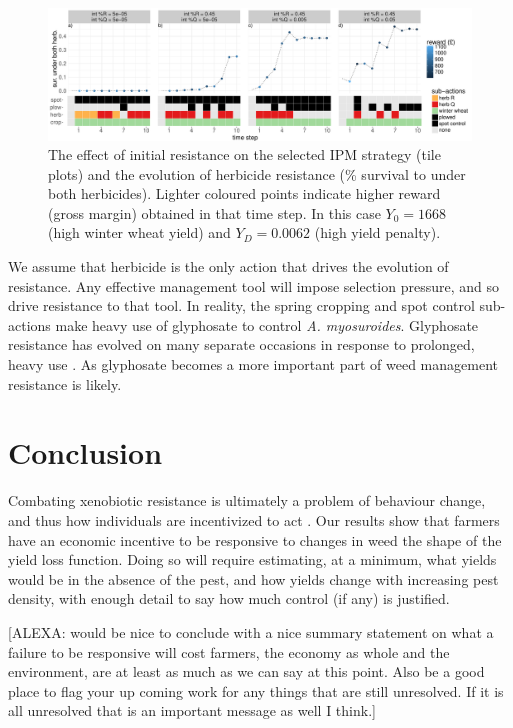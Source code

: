 \documentclass[9pt,twocolumn,twoside,lineno]{pnas-new}
\begin{document}
\begin{figure}[!ht]
	\includegraphics[width=178mm]{int_res_strat_resist.pdf}
	\caption{The effect of initial resistance on the selected IPM strategy (tile plots) and the evolution of herbicide resistance (\% survival to under both herbicides). Lighter coloured points indicate higher reward (gross margin) obtained in that time step. In this case $Y_0 = 1668$ (high winter wheat yield) and $Y_D = 0.0062$ (high yield penalty).}
	\label{fig:int_res} 
\end{figure}

We assume that herbicide is the only action that drives the evolution of resistance. Any effective management tool will impose selection pressure, and so drive resistance to that tool. In reality, the spring cropping and spot control sub-actions make heavy use of glyphosate to control \textit{A. myosuroides}. Glyphosate resistance has evolved on many separate occasions in response to prolonged, heavy use \citep{Samm2014}. As glyphosate becomes a more important part of weed management \citep{Hick2018} resistance is likely. 

\section*{Conclusion}
Combating xenobiotic resistance is ultimately a problem of behaviour change, and thus how individuals are incentivized to act \citep{Hurl2016}. Our results show that farmers have an economic incentive to be responsive to changes in weed the shape of the yield loss function. Doing so will require estimating, at a minimum, what yields would be in the absence of the pest, and how yields change with increasing pest density, with enough detail to say how much control (if any) is justified.    

[ALEXA: would be nice to conclude with a nice summary statement on what a failure to be responsive will cost farmers, the economy as whole and the environment, are at least as much as we can say at this point. Also be a good place to flag your up coming work for any things that are still unresolved. If it is all unresolved that is an important message as well I think.] 
\end{document}
